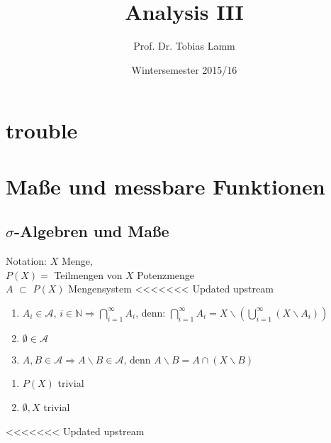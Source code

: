 \documentclass[11pt]{memoir}
\begin{document}
\title{Analysis III}
\author{Prof. Dr. Tobias Lamm}
\date{Wintersemester 2015/16}

\maketitle
\chapter{trouble}
\chapter{Maße und messbare Funktionen}
\section{$\sigma$-Algebren und Maße}
Notation: $X$ Menge, \\ $P(X) =$ \textbraceleft Teilmengen von $X$\textbraceright  {} Potenzmenge \\
$A$ $\subset$  $P(X)$ Mengensystem
<<<<<<< Updated upstream

\begin{Bemerkung}
\begin{enumerate}
	\item $A_i \in \mathscr{A}$, $i \in \mathbb{N} \Rightarrow \bigcap_{i = 1}^{\infty} A_i$, denn:
	$\bigcap_{i=1}^{\infty} A_i = X\backslash (\bigcup_{i=1}^{\infty} (X \backslash A_i))$
	\item $\emptyset \in \mathscr{A}$
	\item $A, B \in \mathscr{A} \Rightarrow A \backslash B \in \mathscr{A}$, denn $A \backslash B = A \cap (X \backslash B)$
\end{enumerate}
\end{Bemerkung}

\begin{Beispiel}
\begin{enumerate}
	\item $P(X)$ trivial
	\item \textbraceleft$ \emptyset, X $\textbraceright{} trivial
\end{enumerate}
\end{Beispiel}

<<<<<<< Updated upstream
\end{document}
